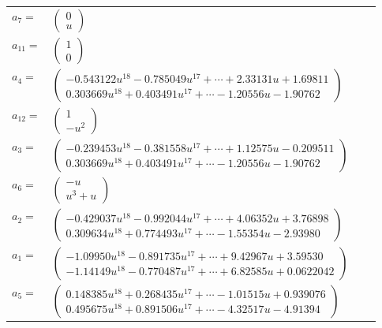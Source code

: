 \documentclass[1p]{elsarticle_modified}
\theoremstyle{definition}
\begin{document}
\begin{tabular}{m{7pt} m{180pt} m{7pt} m{180pt} }
\flushright $a_{7}=$&$\begin{pmatrix}0\\u\end{pmatrix}$ \\
\flushright $a_{11}=$&$\begin{pmatrix}1\\0\end{pmatrix}$ \\
\flushright $a_{4}=$&$\begin{pmatrix}-0.543122 u^{18}-0.785049 u^{17}+\cdots+2.33131 u+1.69811\\0.303669 u^{18}+0.403491 u^{17}+\cdots-1.20556 u-1.90762\end{pmatrix}$ \\
\flushright $a_{12}=$&$\begin{pmatrix}1\\- u^2\end{pmatrix}$ \\
\flushright $a_{3}=$&$\begin{pmatrix}-0.239453 u^{18}-0.381558 u^{17}+\cdots+1.12575 u-0.209511\\0.303669 u^{18}+0.403491 u^{17}+\cdots-1.20556 u-1.90762\end{pmatrix}$ \\
\flushright $a_{6}=$&$\begin{pmatrix}- u\\u^3+u\end{pmatrix}$ \\
\flushright $a_{2}=$&$\begin{pmatrix}-0.429037 u^{18}-0.992044 u^{17}+\cdots+4.06352 u+3.76898\\0.309634 u^{18}+0.774493 u^{17}+\cdots-1.55354 u-2.93980\end{pmatrix}$ \\
\flushright $a_{1}=$&$\begin{pmatrix}-1.09950 u^{18}-0.891735 u^{17}+\cdots+9.42967 u+3.59530\\-1.14149 u^{18}-0.770487 u^{17}+\cdots+6.82585 u+0.0622042\end{pmatrix}$ \\
\flushright $a_{5}=$&$\begin{pmatrix}0.148385 u^{18}+0.268435 u^{17}+\cdots-1.01515 u+0.939076\\0.495675 u^{18}+0.891506 u^{17}+\cdots-4.32517 u-4.91394\end{pmatrix}$ \\

\end{tabular}
\end{document}
